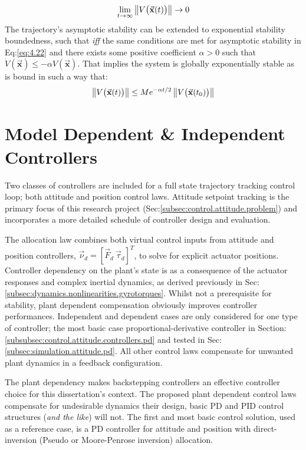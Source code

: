 \begin{equation}
\lim_{t\rightarrow\infty}\left\lVert V\big(\vec{\mathbf{x}}(t)\big)\right\rVert\rightarrow 0
\end{equation}
The trajectory's asymptotic stability can be extended to exponential stability boundedness, such that \emph{iff} the same conditions are met for asymptotic stability in Eq:\ref{eq:4.22} and there exists some positive coefficient $\alpha>0$ such that $\dot{V}(\vec{\mathbf{x}})\leq-\alpha V(\vec{\mathbf{x}})$. That implies the system is globally exponentially stable as is bound in such a way that:
\begin{equation}
\left\lVert V\big(\vec{\mathbf{x}}(t)\big)\right\rVert\leq Me^{-\alpha t/2}\left\lVert V\big(\vec{\mathbf{x}}(t_0)\big)\right\rVert
\end{equation}
\section{Model Dependent \& Independent Controllers}
Two classes of controllers are included for a full state trajectory tracking control loop; both attitude and position control laws. Attitude setpoint tracking is the primary focus of this research project (Sec:\ref{subsec:control.attitude.problem}) and incorporates a more detailed schedule of controller design and evaluation. 
\par
The allocation law combines both virtual control inputs from attitude and position controllers, $\vec{\nu}_d=[\vec{F}_d~\vec{\tau}_d]^T$, to solve for explicit actuator positions. Controller dependency on the plant's state is as a consequence of the actuator responses and complex inertial dynamics, as derived previously in Sec:\ref{subsec:dynamics.nonlinearities.gyrotorques}. Whilst not a prerequisite for stability, plant dependent compensation obviously improves controller performances. Independent and dependent cases are only considered for one type of controller; the most basic case proportional-derivative controller in Section:\ref{subsubsec:control.attitude.controllers.pd} and tested in Sec:\ref{subsec:simulation.attitude.pd}. All other control laws compensate for unwanted plant dynamics in a feedback configuration.
\par
The plant dependency makes backstepping controllers an effective controller choice for this dissertation's context. The proposed plant dependent control laws compensate for undesirable dynamics their design, basic PD and PID control structures (\emph{and the like}) will not. The first and most basic control solution, used as a reference case, is a PD controller for attitude and position with direct-inversion (Pseudo or Moore-Penrose inversion) allocation. 

